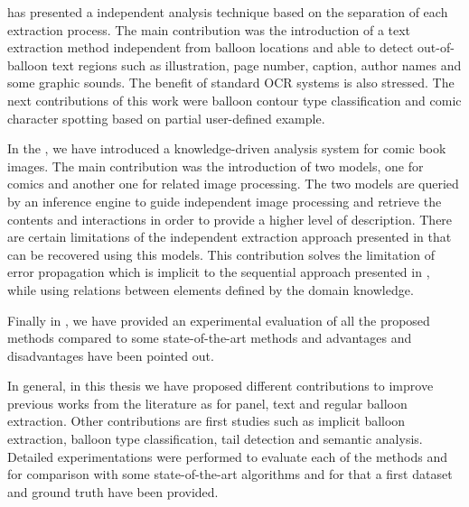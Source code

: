  has presented a independent analysis technique based on the separation of each extraction process.
The main contribution was the introduction of a text extraction method independent from balloon locations and able to detect out-of-balloon text regions such as illustration, page number, caption, author names and some graphic sounds.
The benefit of standard OCR systems is also stressed.
The next contributions of this work were balloon contour type classification and comic character spotting based on partial user-defined example.

In the , we have introduced a knowledge-driven analysis system for comic book images.
The main contribution was the introduction of two models, one for comics and another one for related image processing.
The two models are queried by an inference engine to guide independent image processing and retrieve the contents and interactions in order to provide a higher level of description.
There are certain limitations of the independent extraction approach presented in  that can be recovered using this models.
This contribution solves the limitation of error propagation which is implicit to the sequential approach presented in , while using relations between elements defined by the domain knowledge.

Finally in , we have provided an experimental evaluation of all the proposed methods compared to some state-of-the-art methods and advantages and disadvantages have been pointed out.

In general, in this thesis we have proposed different contributions to improve previous works from the literature as for panel, text and regular balloon extraction.
Other contributions are first studies such as implicit balloon extraction, balloon type classification, tail detection and semantic analysis.
Detailed experimentations were performed to evaluate each of the methods and for comparison with some state-of-the-art algorithms and for that a first dataset and ground truth have been provided.

